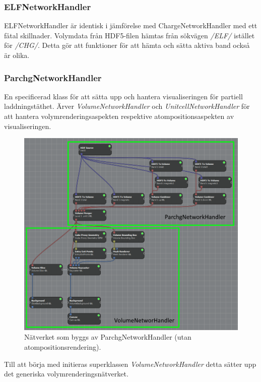 \documentclass[10pt,oneside,swedish]{article}
\begin{document}
\subsubsection{ELFNetworkHandler}\label{elfnetworkhandler}

ELFNetworkHandler är identisk i jämförelse med ChargeNetworkHandler med
ett fåtal skillnader. Volymdata från HDF5-filen hämtas från sökvägen
\emph{/ELF/} istället för \emph{/CHG/}. Detta gör att funktioner för att
hämta och sätta aktiva band också är olika.

\subsubsection{ParchgNetworkHandler}\label{parchgnetworkhandler}

En specificerad klass för att sätta upp och hantera visualiseringen för
partiell laddningstäthet. Ärver \emph{VolumeNetworkHandler} och
\emph{UnitcellNetworkHandler} för att hantera volymrenderingsaspekten
respektive atompositionsaspekten av visualiseringen.

\begin{figure}[H]
\centering
\includegraphics[width=1.00000\textwidth]{Images/parchg_network_ex.png}
\caption{Nätverket som byggs av ParchgNetworkHandler (utan
atompositionsrendering).}
\end{figure}

Till att börja med initieras superklassen \emph{VolumeNetworkHandler}
detta sätter upp det generiska volymrenderingsnätverket.
\end{document}
